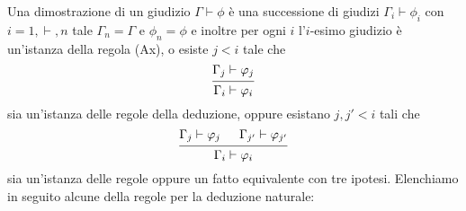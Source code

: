 \documentclass[]{marticle}
\begin{document}
\begin{block}[Definizione]
    Una dimostrazione di un giudizio $\Gamma\vdash \phi$ \`e una successione di
    giudizi $\Gamma_i\vdash \phi_i$ con $i=1,\vdash,n$ tale $\Gamma_n=\Gamma$ e
    $\phi_n=\phi$ e inoltre per ogni $i$ l'$i$-esimo giudizio \`e un'istanza
    della regola (Ax), o esiste $j<i$ tale che
    \[
        \begin{prooftree}
            \hypo{\Gamma_j\vdash\phi_j}
            \infer1{\Gamma_i\vdash\phi_i}
        \end{prooftree}
    \]
    sia un'istanza delle regole della deduzione, oppure esistano $j, j' <i$ tali
    che
    \[
        \begin{prooftree}
            \hypo{\Gamma_j\vdash\phi_j}
            \hypo{\Gamma_{j'}\vdash\phi_{j'}}
            \infer2{\Gamma_i\vdash\phi_i}
        \end{prooftree}
    \]
    sia un'istanza delle regole oppure un fatto equivalente con tre ipotesi.
    Elenchiamo in seguito alcune della regole per la deduzione naturale:


\end{block}
\end{document}

